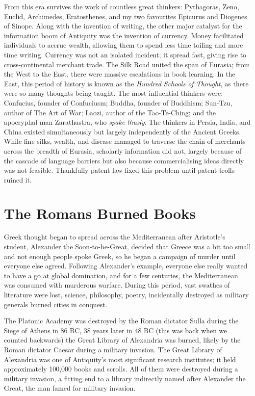 From this era survives the work of countless great thinkers: Pythagoras, Zeno, Euclid, Archimedes, Eratosthenes, and my two favourites Epicurus and Diogenes of Sinope. Along with the invention of writing, the other major catalyst for the information boom of Antiquity was the invention of currency. Money facilitated individuals to accrue wealth, allowing them to spend less time toiling and more time writing. Currency was not an isolated incident; it spread fast, giving rise to cross-continental merchant trade. The Silk Road united the span of Eurasia; from the West to the East, there were massive escalations in book learning. In the East, this period of history is known as the \textit{Hundred Schools of Thought}, as there were so many thoughts being taught. The most influential thinkers were: Confucius, founder of Confuciusm; Buddha, founder of Buddhism; Sun-Tzu, author of The Art of War; Laozi, author of the Tao-Te-Ching; and the apocryphal man Zarathustra, who \textit{spake thusly}. The thinkers in Persia, India, and China existed simultaneously but largely independently of the Ancient Greeks. While fine silks, wealth, and disease managed to traverse the chain of merchants across the breadth of Eurasia, scholarly information did not, largely because of the cascade of language barriers but also because commercialising ideas directly was not feasible. Thankfully patent law fixed this problem until patent trolls ruined it.

\section{The Romans Burned Books}

Greek thought began to spread across the Mediterranean after Aristotle's student, Alexander the Soon-to-be-Great, decided that Greece was a bit too small and not enough people spoke Greek, so he began a campaign of murder until everyone else agreed. Following Alexander's example, everyone else really wanted to have a go at global domination, and for a few centuries, the Mediterranean was consumed with murderous warfare. During this period, vast swathes of literature were lost, science, philosophy, poetry, incidentally destroyed as military generals burned cities in conquest. 

The Platonic Academy was destroyed by the Roman dictator Sulla during the Siege of Athens in 86 BC, 38 years later in 48 BC (this was back when we counted backwards) the Great Library of Alexandria was burned, likely by the Roman dictator Caesar during a military invasion. The Great Library of Alexandria was one of Antiquity's most significant research institutes; it held approximately 100,000 books and scrolls. All of them were destroyed during a military invasion, a fitting end to a library indirectly named after Alexander the Great, the man famed for military invasion.


